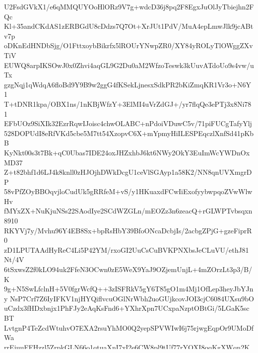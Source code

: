 U2FsdGVkX1/e6qMMQUYOoHlORz9V7g+wdcD36j8pq2F8EgxJuOlJyTbiejhn2FQc
Kl+35andCKdAS1zERBGdU8cDdzs7Q7Ot+XrJUt1PdV/MuA4epLmwJlk9jcABtv7p
oDKnEdHNDbSjg/O1FttxoybBikrfx5lROUrYNwpZR0/XY84yROLyTlOWggZXvTiV
EUWQ8arpIKSOwJ0x0Zhvi4aqGL9G2Du0aM2WfzoTeswk3kUuvATdoUo9s4vw/uTx
gzgNqj1qWdqA6floBd9Y9B9w2ggG4fKSekLjnesxSdkPR2bKiZmqKR1Vr3o+N6Y1
T+tDNR1kpa/OBX1ns/1nKBjWfzY+3ElMI4uVrZdGJ+/yr7flqQe3ePTj3x8Ni781
EFbUOz9SiXIk32EzrRqwIJoisc4chwOLABC+nPdoiVDuwC5v/71piFUCgTafyYlj
528DOPUdI8eRfVKd5cbe5M7tt54XzopvC6X+mYpmyHiILESPEqczlXnfSd41pKbB
KyNkt00s3t7Bk+qC0Ubas7IDE24oxJHZxhbJ6kt6NWy2OkY3EuImWcYWDnOxMD37
Z+t82bhf1d6LJ4k8knll0zHJOjhDWkDcgU1ceVlSGAyp1a58K2/NN8qnUVXmgrDP
58vPfZOyBBOqvjloCudUk5gRRfeM+vS/y1HKuaxdFCwIiExofyybwpqoZVwWlwHv
fMYxZX+NuKjuNSs22SAodIye2SCdWZGLn/mEOZz3n6zeacQ+rGLWPTvbsqxn8910
RKYVj7y/Mvhu96Y4EB8Sx+bpRsHbY39BfoONcaDcbjIs/2acbgZPjG+gzeFiprR0
zD1LPUTAAdHyReC4Li5P42YM/rxoGI2UuCsCuBVKPNXbsJeCLuVU/ethJ81Nt/4V
6tSxwsZ2f0kLO94uk2FfeN3OCwn0zE5WeX9YaJ9OZjemUnjL+4mZOrzLt3p3/B/K
9g+N5SwLfclnH+5V0fgrWcfQ++3zISFRkV5gY6T85gO1m4Mj1OfLep3heyJbYJny
NsP7Crf7Z6IyIFKV1njHYQiflvcuOGlNrWbh2uoGUjkcovJOI3cjC6084UXsu9bO
uCzdx3fHDxbnjx1PhFJy2eAqKsFnd6+YXhrXpn7UCxpaNzptOBtGi/5LGaK5scBT
LvtgnP4TeZcdWtuhvO7EXA2rsuYhMO0Q2yepSPVWIwI6j75rjwgEqpOr9UMoDfWa
rrEjuuFFHzzl5ZrpkGLN66o1qtuaXnI7xI2e6CW8pl9tUf77rYQXI8qqKgXWqn2K
ZXtfvuAtFHA0p5oLIKRdrEEMU1SM46YHZ/fyj424mrLx/PuZgNC0ZjR6Gj8nXUAa
TOXYrSDnSxS+fgssixW78kiKUqJ+kL6HKVW2znpx7Jv6KgEUBrBf9pPys0RmQZIa
cbrNWIvMs+BcggXryB6Dds126dOKiOSel6yJ75z8/GhABQ4QTKJ1boZAUKMeU8W2
RK1wmiCTVkr9yf0VC4tmnX7cgwzJJayvFm4lcvMnjwp+DIKLuUvXC/5cKK5ATjXz
0lm99oh1Y7uea1OB+T1Z8RBe7Nkc2IJ9IuBT2XA79uSWmP74jm3OWfDSTPgGcigZ
c6BB4BMFdbfBFFPD06SzlkpDDdM+2XPTS0hPxx9TW4bQiZtU/ZVZc5PcyFEGXFPQ
eMpbJTuQ6ivLqZlBev6BX9tZ9FCJCSRZiD3oGBi8lyR51NKIqvnFFF4Qzlc+JTzw
f9wYMVHrUCuqSptSmaRE3Ajp29QVMrpHU+ZLw6cwqehIYqolX0IbO9ZpyPpr0XVr
Vy1Kvs6RwLpUD6AgeJCIDQrqqxcm+rIwf/UxBHiW2qJ9DYKQBTrQWAmJeI6hRSSW
0ao50Arjt6EsibDIidXgfGpPkPnpSWRwTZECENHsdQ1BGTrdMwD6IAKFVDoR4SXC
OPjQeNphi+oKYum5H5Sd0Kcg9Dxse5RVh2dECeAcHmz74NanjpvoPdyNDKUhhYgU
uUECJ7J980ZRg2YIEb495D9vxvMgsJt+yqgbER7EnndBiFMH0YnB0g6modyv+jF0
/uI3KZ5iini0wMhWNbk5H5GML76uZ4i8/QXM6nenSPCi2+NJ8CBOEt7Lt1HAIyo9
UngbOkFwB2XiZ/ee0pJOPIRvidiDJA/skx6lzezSYiHx4w4a7joel5ykq6IV6mMM
yfxqiQywy2UKBq3NhtNSwfB18QstiSRDKMQu3xEhfOxYqGF9W+9DjO71SRb05OmX
6nWlKEaHuSeguMNvL7qiIn+atyzOjaGRCUdNEXYFYsC9FjN9co2c8Cd3cpvaFY+G
uoWsA1Zq+HRiabUAAgh0fj0wDudrLG8+yjS2WcePxp8zCmHXuOxzWo+i9Gs85RHY
H3AVUwZ6YvgL3k8cUlLNL1X5Stor8Znfnz5inaPE2n9nnSInzdvH2UjvPhjvPkGh
o/iRr3zwROUVJV/N7+fnTV4vGqOcVUuhfGyURPZVgDLWy6RlzXQpmV1GgCTFVuXh
tbgiZiU5L/HsLqUg8YU+2xX+px/SiRqrA5GRNogRxmkYI1PyppOyrjfv3wzUhAbr
